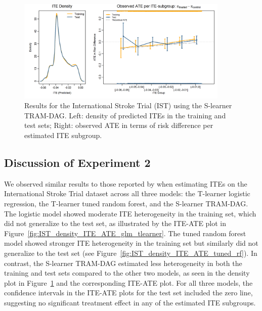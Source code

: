 \begin{figure}[htbp]
\centering
\includegraphics[width=0.9\textwidth]{img/results_IST/IST_TRAM_DAG_slearner_density_ITE_ATE.png}
\caption{Results for the International Stroke Trial (IST) using the S-learner TRAM-DAG. Left: density of predicted ITEs in the training and test sets; Right: observed ATE in terms of risk difference per estimated ITE subgroup.}
\label{fig:IST_density_ITE_ATE_TRAM_DAG}
\end{figure}


\FloatBarrier


\subsection{Discussion of Experiment 2}

We observed similar results to those reported by \citet{chen2025} when estimating ITEs on the International Stroke Trial dataset across all three models: the T-learner logistic regression, the T-learner tuned random forest, and the S-learner TRAM-DAG. The logistic model showed moderate ITE heterogeneity in the training set, which did not generalize to the test set, as illustrated by the ITE-ATE plot in Figure~\ref{fig:IST_density_ITE_ATE_glm_tlearner}. The tuned random forest model showed stronger ITE heterogeneity in the training set but similarly did not generalize to the test set (see Figure~\ref{fig:IST_density_ITE_ATE_tuned_rf}). In contrast, the S-learner TRAM-DAG estimated less heterogeneity in both the training and test sets compared to the other two models, as seen in the density plot in Figure~\ref{fig:IST_density_ITE_ATE_TRAM_DAG} and the corresponding ITE-ATE plot. For all three models, the confidence intervals in the ITE-ATE plots for the test set included the zero line, suggesting no significant treatment effect in any of the estimated ITE subgroups.

\medskip



